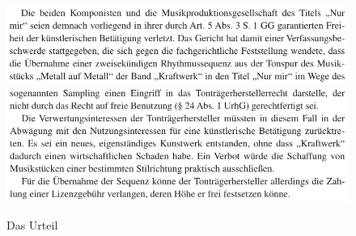 \documentclass[a4paper, 11pt]{article}
\begin{document}
\listoffigures

\begin{figure}
\centering
\includegraphics[width=1\textwidth]{../urteilA.png}
\includegraphics[width=1\textwidth]{../urteilB.png}
\caption{Das Urteil}
\label{img:Urteil}
\end{figure}
\end{document}
